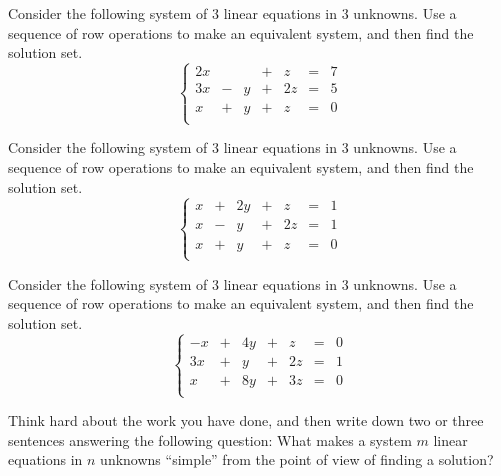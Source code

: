 \documentclass[elementsmain.tex]{subfiles}
\begin{document}
\begin{exercise}
Consider the following system of $3$ linear equations in $3$ unknowns. Use a sequence of row operations to make an equivalent system, and then find the solution set.
\[
\left\{\begin{array}{rrrrrrr}
2x &  &   & + & z & = & 7 \\
3x & - & y & + & 2z & = & 5 \\
x & + & y & + & z & = & 0 \\
\end{array}\right.
\]
\end{exercise}

\begin{exercise}
Consider the following system of $3$ linear equations in $3$ unknowns. Use a sequence of row operations to make an equivalent system, and then find the solution set.
\[
\left\{\begin{array}{rrrrrrr}
x & + & 2y & + & z & = & 1 \\
x & - & y & + & 2z & = & 1 \\
x & + & y & + & z & = & 0 \\
\end{array}\right.
\]
\end{exercise}

\begin{exercise}
Consider the following system of $3$ linear equations in $3$ unknowns. Use a sequence of row operations to make an equivalent system, and then find the solution set.
\[
\left\{\begin{array}{rrrrrrr}
-x & + & 4y & + & z & = & 0 \\
3x & + & y & + & 2z & = & 1 \\
x & + & 8y & + & 3z & = & 0 \\
\end{array}\right.
\]
\end{exercise}



\begin{exercise} Think hard about the work you have done, and then write down two or three sentences answering the following question: What makes a system $m$ linear equations in $n$ unknowns ``simple'' from the point of view of finding a solution?
\end{exercise}

\clearpage
\end{document}
